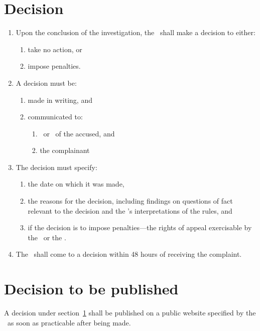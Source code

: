 \documentclass[12pt]{report}
\begin{document}
  \section{Decision}\label{sec:RefereeDecision}
  \begin{enumerate}
    \item Upon the conclusion of the investigation, the \Referee\ shall make a decision to either:
    \begin{enumerate}
      \item take no action, or
      \item impose penalties.
    \end{enumerate}
    \item A decision must be:
    \begin{enumerate}
      \item made in writing, and
      \item communicated to:
      \begin{enumerate}
      \item \Captain\ or \President\ of the accused, and
      \item the complainant
      \end{enumerate}
    \end{enumerate}
    \item The decision must specify:
    \begin{enumerate}
      \item the date on which it was made,
      \item the reasons for the decision, including findings on questions of fact relevant to the decision and the \Referee's interpretations of the rules, and
      \item if the decision is to impose penalties---the rights of appeal exercisable by the \Captain\ or the \President.
    \end{enumerate}
    \item The \Referee\ shall come to a decision within 48 hours of receiving the complaint.
  \end{enumerate}
  \section{Decision to be published}\label{sec:DecisionPublish}
  \begin{fenumerate}
    \item A decision under section~\ref{sec:RefereeDecision} shall be published on a public website  specified by the \RaceDirector\ as soon as practicable after being made.
  \end{fenumerate}
\end{document}
